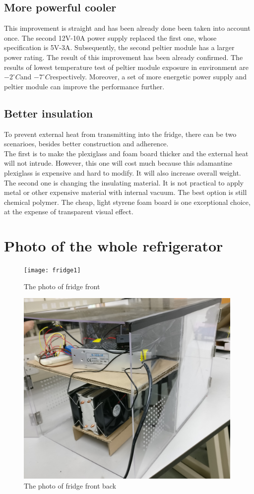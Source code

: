 \documentclass[12pt,onecolumn]{article}
\begin{document}
\subsection{More powerful cooler}
This improvement is straight and has been already done been taken into account once. The second 12V-10A power supply replaced the first one, whose specification is 5V-3A. Subsequently, the second peltier module has a larger power rating. The result of this improvement has been already confirmed. The results of lowest temperature test of peltier module exposure in environment are $-2^{\circ}C$and $-7^{\circ}C$respectively. Moreover, a set of more energetic power supply and peltier module can improve the performance further. 
\subsection{Better insulation}
To prevent external heat from transmitting into the fridge, there can be two scenarioes, besides better construction and adherence. \\
The first is to make the plexiglass and foam board thicker and the external heat will not intrude. However, this one will cost much because this adamantine plexiglass is expensive and hard to modify. It will also increase overall weight.\\
The second one is changing the insulating material. It is not practical to apply metal or other expensive material with internal vacuum. The best option is still chemical polymer. The cheap, light styrene foam board is one exceptional choice, at the expense of transparent visual effect.  




\section{Photo of the whole refrigerator}
\begin{figure}[H]
	\centering
	\texttt{[image: fridge1]}
	\caption{The photo of fridge front}
\end{figure}

\begin{figure}[H]
	\centering
	\includegraphics[width=11cm]{fridge2}
	\caption{The photo of fridge front back}
\end{figure}
\end{document}
